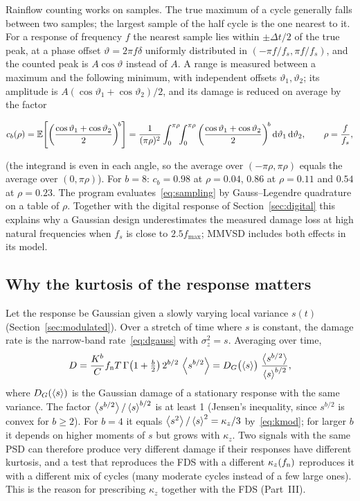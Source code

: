Rainflow counting works on samples. The true maximum of a cycle generally falls between two samples;
the largest sample of the half cycle is the one nearest to it. For a response of frequency $f$ the
nearest sample lies within $\pm\Delta t/2$ of the true peak, at a phase offset $\vartheta = 2\pi f
\delta$ uniformly distributed in $(-\pi f/f_s, \pi f/f_s)$, and the counted peak is $A\cos\vartheta$
instead of $A$. A range is measured between a maximum and the following minimum, with independent
offsets $\vartheta_1,\vartheta_2$; its amplitude is $A(\cos\vartheta_1+\cos\vartheta_2)/2$, and its
damage is reduced on average by the factor
\begin{result}
\begin{equation}\label{eq:sampling}
  c_b(\rho) = \mathbb{E}\!\left[\left(\frac{\cos\vartheta_1+\cos\vartheta_2}{2}\right)^{\!b}\right]
  = \frac{1}{(\pi\rho)^2}\int_0^{\pi\rho}\!\!\int_0^{\pi\rho}
  \left(\frac{\cos\vartheta_1+\cos\vartheta_2}{2}\right)^{\!b}\mathrm{d}\vartheta_1\,\mathrm{d}\vartheta_2 ,
  \qquad \rho = \frac{f}{f_s},
\end{equation}
\end{result}
(the integrand is even in each angle, so the average over $(-\pi\rho,\pi\rho)$ equals the average
over $(0,\pi\rho)$). For $b=8$: $c_b = 0.98$ at $\rho = 0.04$, $0.86$ at $\rho = 0.11$ and $0.54$ at
$\rho=0.23$. The program evaluates~\eqref{eq:sampling} by Gauss--Legendre quadrature on a table of
$\rho$. Together with the digital response of Section~\ref{sec:digital} this explains why a Gaussian
design underestimates the measured damage loss at high natural frequencies when $f_s$ is close to
$2.5f_{\max}$; MMVSD includes both effects in its model.

\subsection{Why the kurtosis of the response matters}\label{sec:kzdamage}

Let the response be Gaussian given a slowly varying local variance $s(t)$ (Section~\ref{sec:modulated}).
Over a stretch of time where $s$ is constant, the damage rate is the narrow-band
rate~\eqref{eq:dgauss} with $\sigma_z^2 = s$. Averaging over time,
\begin{equation}
  D = \frac{K^b}{C}f_{\mathrm{n}} T\,\Gamma\!\left(1+\tfrac b2\right) 2^{b/2}\,\left\langle s^{b/2} \right\rangle
  = D_G\bigl(\left\langle s \right\rangle\bigr)\;\frac{\left\langle s^{b/2} \right\rangle}{\left\langle s \right\rangle^{b/2}} ,
\end{equation}
where $D_G(\left\langle s \right\rangle)$ is the Gaussian damage of a stationary response with the same variance.
The factor $\left\langle s^{b/2} \right\rangle/\left\langle s \right\rangle^{b/2}$ is at least 1 (Jensen's inequality, since $s^{b/2}$ is
convex for $b\ge2$). For $b=4$ it equals $\left\langle s^2 \right\rangle/\left\langle s \right\rangle^2 = \kappa_z/3$ by~\eqref{eq:kmod}; for
larger $b$ it depends on higher moments of $s$ but grows with $\kappa_z$. Two signals with the same PSD
can therefore produce very different damage if their responses have different kurtosis, and a test
that reproduces the FDS with a different $\kappa_z(f_{\mathrm{n}})$ reproduces it with a different mix of cycles
(many moderate cycles instead of a few large ones). This is the reason for prescribing $\kappa_z$
together with the FDS (Part~III).
